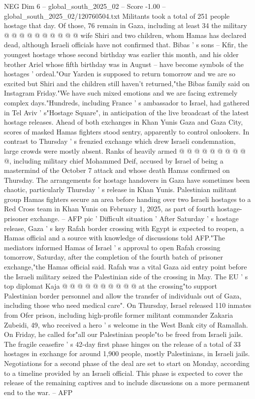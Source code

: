 \begin{textsample}{NEG Dim 6 – global\_south\_2025\_02 – Score -1.00 – global\_south\_2025\_02/120760504.txt}
Militants took a total of 251 people hostage that day.
Of those, 76 remain in Gaza, including at least 34 the military @ @ @ @ @ @ @ @ @ @ wife Shiri and two children, whom Hamas has declared dead, although Israeli officials have not confirmed that.
Bibas ' s sons -- Kfir, the youngest hostage whose second birthday was earlier this month, and his older brother Ariel whose fifth birthday was in August -- have become symbols of the hostages ' ordeal."Our Yarden is supposed to return tomorrow and we are so excited but Shiri and the children still haven't returned,"the Bibas family said on Instagram Friday."We have such mixed emotions and we are facing extremely complex days."Hundreds, including France ' s ambassador to Israel, had gathered in Tel Aviv ' s"Hostage Square", in anticipation of the live broadcast of the latest hostage releases.
Ahead of both exchanges in Khan Yunis Gaza and Gaza City, scores of masked Hamas fighters stood sentry, apparently to control onlookers.
In contrast to Thursday ' s frenzied exchange which drew Israeli condemnation, large crowds were mostly absent.
Ranks of heavily armed @ @ @ @ @ @ @ @ @ @, including military chief Mohammed Deif, accused by Israel of being a mastermind of the October 7 attack and whose death Hamas confirmed on Thursday.
The arrangements for hostage handovers in Gaza have sometimes been chaotic, particularly Thursday ' s release in Khan Yunis.
Palestinian militant group Hamas fighters secure an area before handing over two Israeli hostages to a Red Cross team in Khan Yunis on February 1, 2025, as part of fourth hostage-prisoner exchange. -- AFP pic ' Difficult situation ' After Saturday ' s hostage release, Gaza ' s key Rafah border crossing with Egypt is expected to reopen, a Hamas official and a source with knowledge of discussions told AFP."The mediators informed Hamas of Israel ' s approval to open Rafah crossing tomorrow, Saturday, after the completion of the fourth batch of prisoner exchange,"the Hamas official said.
Rafah was a vital Gaza aid entry point before the Israeli military seized the Palestinian side of the crossing in May.
The EU ' s top diplomat Kaja @ @ @ @ @ @ @ @ @ @ at the crossing"to support Palestinian border personnel and allow the transfer of individuals out of Gaza, including those who need medical care".
On Thursday, Israel released 110 inmates from Ofer prison, including high-profile former militant commander Zakaria Zubeidi, 49, who received a hero ' s welcome in the West Bank city of Ramallah.
On Friday, he called for"all our Palestinian people"to be freed from Israeli jails.
The fragile ceasefire ' s 42-day first phase hinges on the release of a total of 33 hostages in exchange for around 1,900 people, mostly Palestinians, in Israeli jails.
Negotiations for a second phase of the deal are set to start on Monday, according to a timeline provided by an Israeli official.
This phase is expected to cover the release of the remaining captives and to include discussions on a more permanent end to the war. -- AFP

\end{textsample}
